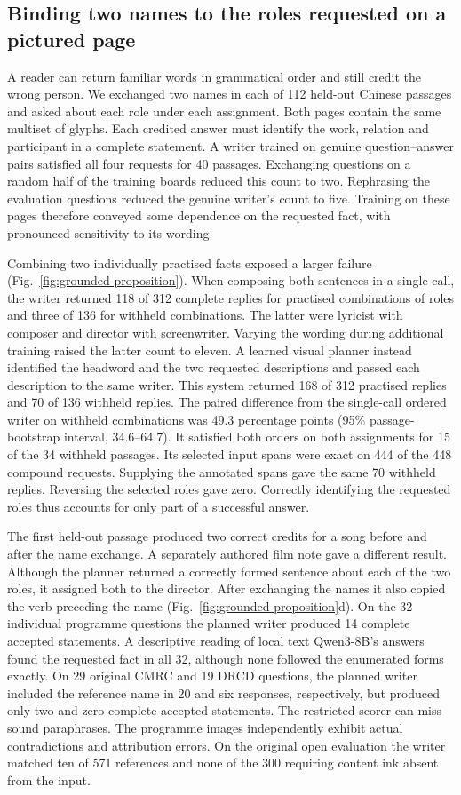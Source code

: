 \subsection*{Binding two names to the roles requested on a pictured page}
A reader can return familiar words in grammatical order and still credit the wrong person. We exchanged two names in each of 112 held-out Chinese passages and asked about each role under each assignment. Both pages contain the same multiset of glyphs. Each credited answer must identify the work, relation and participant in a complete statement. A writer trained on genuine question--answer pairs satisfied all four requests for 40 passages. Exchanging questions on a random half of the training boards reduced this count to two. Rephrasing the evaluation questions reduced the genuine writer's count to five. Training on these pages therefore conveyed some dependence on the requested fact, with pronounced sensitivity to its wording.

Combining two individually practised facts exposed a larger failure (Fig.~\ref{fig:grounded-proposition}). When composing both sentences in a single call, the writer returned 118 of 312 complete replies for practised combinations of roles and three of 136 for withheld combinations. The latter were lyricist with composer and director with screenwriter. Varying the wording during additional training raised the latter count to eleven. A learned visual planner instead identified the headword and the two requested descriptions and passed each description to the same writer. This system returned 168 of 312 practised replies and 70 of 136 withheld replies. The paired difference from the single-call ordered writer on withheld combinations was 49.3 percentage points (95\% passage-bootstrap interval, 34.6--64.7). It satisfied both orders on both assignments for 15 of the 34 withheld passages. Its selected input spans were exact on 444 of the 448 compound requests. Supplying the annotated spans gave the same 70 withheld replies. Reversing the selected roles gave zero. Correctly identifying the requested roles thus accounts for only part of a successful answer.

The first held-out passage produced two correct credits for a song before and after the name exchange. A separately authored film note gave a different result. Although the planner returned a correctly formed sentence about each of the two roles, it assigned both to the director. After exchanging the names it also copied the verb preceding the name (Fig.~\ref{fig:grounded-proposition}d). On the 32 individual programme questions the planned writer produced 14 complete accepted statements. A descriptive reading of local text Qwen3-8B's answers found the requested fact in all 32, although none followed the enumerated forms exactly. On 29 original CMRC and 19 DRCD questions, the planned writer included the reference name in 20 and six responses, respectively, but produced only two and zero complete accepted statements. The restricted scorer can miss sound paraphrases. The programme images independently exhibit actual contradictions and attribution errors. On the original open evaluation the writer matched ten of 571 references and none of the 300 requiring content ink absent from the input.

